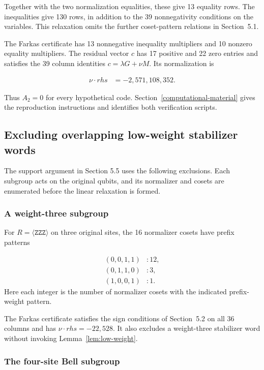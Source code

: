 \documentclass[11pt]{article}
\begin{document}
Together with the two normalization equalities, these give 13 equality rows. The inequalities give 130 rows, in addition to the 39 nonnegativity conditions on the variables. This relaxation omits the further coset-pattern relations in Section~5.1.

The Farkas certificate has 13 nonnegative inequality multipliers and 10 nonzero equality multipliers. The residual vector \(c\) has 17 positive and 22 zero entries and satisfies the 39 column identities \(c=\lambda G+\nu M\). Its normalization is

\[
\begin{aligned}
\nu \cdot rhs &=-2{,}571{,}108{,}352.
\end{aligned}
\]

Thus \(A_{2}=0\) for every hypothetical code. Section~\ref{computational-material} gives the reproduction instructions and identifies both verification scripts.

\subsection{Excluding overlapping low-weight stabilizer words}\label{excluding-overlapping-low-weight-checks}

The support argument in Section 5.5 uses the following exclusions. Each subgroup acts on the original qubits, and its normalizer and cosets are enumerated before the linear relaxation is formed.

\subsubsection{A weight-three subgroup}\label{a-weight-three-subgroup}

For \(R=\langle \mathtt{ZZZ} \rangle\) on three original sites, the 16 normalizer cosets have prefix patterns

\[
\begin{aligned}
(0,0,1,1)&:12, \\
(0,1,1,0)&:3, \\
(1,0,0,1)&:1.
\end{aligned}
\]
Here each integer is the number of normalizer cosets with the indicated prefix-weight pattern.

The Farkas certificate satisfies the sign conditions of Section~5.2 on all 36 columns and has \(\nu \cdot rhs=-22{,}528\). It also excludes a weight-three stabilizer word without invoking Lemma~\ref{lem:low-weight}.

\subsubsection{The four-site Bell subgroup}\label{the-four-site-bell-subgroup}
\end{document}
